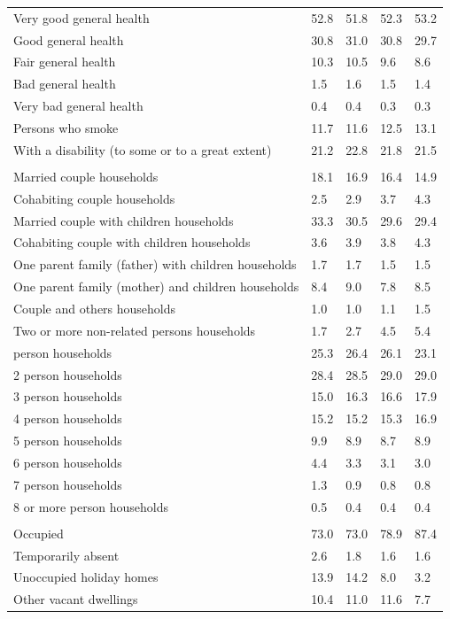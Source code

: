\documentclass{article}
\begin{document}
\begin{table}[h]
\begin{tabular}{KTTTT}
    \hline
Very good general health & 52.8& 51.8&52.3& 53.2\\
Good general health & 30.8& 31.0& 30.8& 29.7\\
Fair general health & 10.3& 10.5& 9.6&  8.6\\
Bad general health & 1.5& 1.6&1.5& 1.4\\
Very bad general health & 0.4& 0.4&0.3& 0.3\\
    \hline
Persons who smoke & 11.7& 11.6&12.5& 13.1\\
    \hline
With a disability (to some or to a great extent) & 21.2& 22.8&21.8& 21.5\\
\hline
    \\ 
    \hline
Married couple households & 18.1& 16.9& 16.4& 14.9\\
Cohabiting couple households & 2.5& 2.9& 3.7& 4.3\\
Married couple with children households & 33.3& 30.5& 29.6& 29.4\\
Cohabiting couple with children households & 3.6& 3.9& 3.8& 4.3\\
One parent family (father) with  children households & 1.7& 1.7& 1.5& 1.5\\
One parent family (mother) and children households & 8.4& 9.0& 7.8& 8.5\\
Couple and others households  & 1.0& 1.0& 1.1& 1.5\\
Two or more non-related persons households & 1.7& 2.7& 4.5& 5.4\\
     person households & 25.3& 26.4& 26.1& 23.1\\
2 person households & 28.4& 28.5& 29.0& 29.0\\
3 person households & 15.0& 16.3& 16.6& 17.9\\
4 person households & 15.2& 15.2& 15.3& 16.9\\
5 person households & 9.9& 8.9& 8.7& 8.9\\
6 person households & 4.4& 3.3& 3.1& 3.0\\
7 person households & 1.3& 0.9& 0.8& 0.8\\
8 or more person households & 0.5& 0.4& 0.4& 0.4\\
\hline
    \\ 
    \hline
Occupied & 73.0& 73.0& 78.9& 87.4\\
Temporarily absent & 2.6& 1.8& 1.6& 1.6\\
Unoccupied holiday homes & 13.9& 14.2&  8.0&  3.2\\
Other vacant dwellings & 10.4& 11.0& 11.6&  7.7\\
\hline
\end{tabular}
\end{table}
\end{document}
